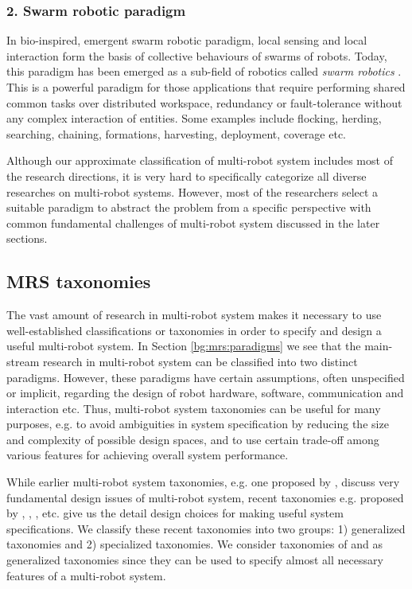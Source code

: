 \subsubsection*{2. Swarm robotic paradigm}
In bio-inspired, emergent swarm robotic paradigm, local sensing and local interaction form the basis of collective behaviours of swarms of robots. Today, this paradigm has been emerged as a sub-field of robotics called {\em swarm robotics} \cite{Sahin+2005}. This is a powerful paradigm for those applications that require performing shared common tasks over distributed workspace, redundancy or fault-tolerance without any complex interaction of entities. Some examples include flocking, herding, searching, chaining, formations, harvesting, deployment, coverage etc. 

Although our approximate classification of multi-robot system includes most of the research directions, it is very hard to specifically categorize all diverse researches on multi-robot systems. However, most of the researchers select a suitable paradigm to abstract the problem from a specific perspective with common fundamental challenges of multi-robot system discussed in the later sections.
\subsection{MRS taxonomies}
\label{bg:mrs:taxonomies}
The vast amount of research in multi-robot system makes it necessary to use well-established classifications or taxonomies in order to specify and design a useful multi-robot system. In Section \ref{bg:mrs:paradigms} we see that the main-stream research in multi-robot system can be classified into two distinct paradigms. However, these paradigms have certain assumptions, often unspecified or implicit, regarding the design of robot hardware, software, communication and interaction etc. Thus, multi-robot system taxonomies can be useful for many purposes, e.g. to avoid ambiguities in system specification by reducing the size and complexity of possible design spaces, and to use certain trade-off among various features for achieving overall system performance.

While earlier multi-robot system taxonomies, e.g. one proposed by ,  discuss very fundamental design issues of multi-robot system, recent taxonomies e.g. proposed by , , ,  etc. give us the detail design choices for making useful system specifications. We classify these recent taxonomies into two groups: 1) generalized taxonomies and 2) specialized taxonomies. We consider taxonomies of  and  as generalized taxonomies since they  can be used to specify almost all necessary features of a multi-robot system.   

